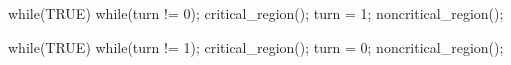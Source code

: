 \documentclass[varwidth=26em,crop]{standalone}
\begin{document}
\begin{minipage}{.45\linewidth}
\vspace{1em}  
\begin{ccode}
while(TRUE){
  while(turn != 0);
  critical_region();
  turn = 1;
  noncritical_region();
}      
\end{ccode}
\end{minipage}\qquad
\begin{minipage}{.48\linewidth}
\vspace{1em}  
\begin{ccode}
while(TRUE){
  while(turn != 1);
  critical_region();
  turn = 0;
  noncritical_region();
}
\end{ccode}  
\end{minipage}
\end{document}
